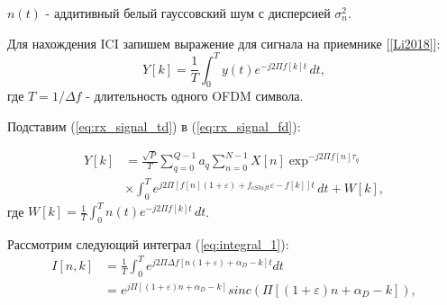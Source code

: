 \noindent $n(t)$ - аддитивный белый гауссовский шум с дисперсией $\sigma_n^2$.

\noindent Для нахождения ICI запишем выражение для сигнала на приемнике [\ref{Li2018}]:
\begin{equation}
    Y[k] = \frac{1}{T} \int_{0}^{T} y(t) e^{-j 2 \Pi f[k] t} \,dt,
    \label{eq:rx_signal_fd}
\end{equation}
\noindent где $T = 1/\Delta f$ - длительность одного OFDM символа.


\noindent Подставим (\ref{eq:rx_signal_td}) в (\ref{eq:rx_signal_fd}):

\begin{equation}
    \label{eq:rx_signal_complete_fd}
    \begin{split}
    Y[k] &= \frac{\sqrt{P}}{T} \sum_{q = 0}^{Q - 1} a_q \sum_{n = 0}^{N-1} X[n] \exp^{-j2 \Pi f[n]\tau_q} \\
         &\times \int_{0}^{T}  e^{j 2 \Pi [f[n] (1 + \varepsilon ) + f_{cShift} \varepsilon - f[k]] t} \,dt + W[k],
    \end{split}
\end{equation}
где $W[k] = \frac{1}{T} \int_{0}^{T} n(t) e^{-j 2 \Pi f[k] t} \,dt$.

\noindent Рассмотрим следующий интеграл (\ref{eq:integral_1}):
\begin{equation}
    \label{eq:integral_1}
    \begin{split}
        I[n, k] &= \frac{1}{T} \int_{0}^{T}  e^{j 2 \Pi \Delta f [n (1 + \varepsilon ) + \alpha_{D} - k] t}dt \\
                &= e^{j \Pi [(1 + \varepsilon )n + \alpha_{D} - k]} sinc(\Pi [ (1 + \varepsilon) n + \alpha_{D} - k]),
    \end{split}
\end{equation}

